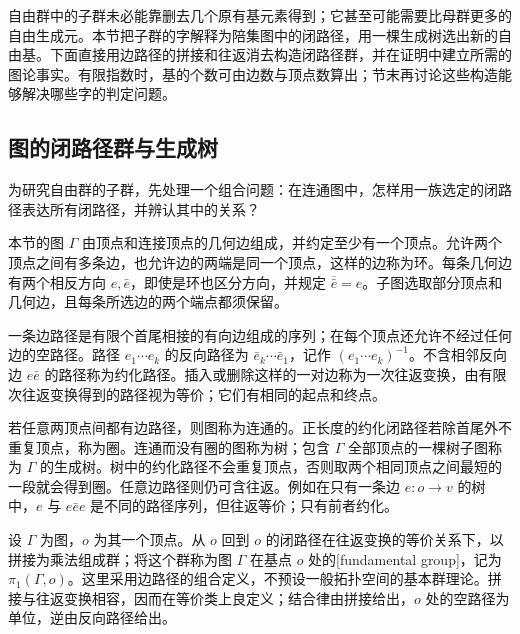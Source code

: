 

自由群中的子群未必能靠删去几个原有基元素得到；它甚至可能需要比母群更多的自由生成元。本节把子群的字解释为陪集图中的闭路径，用一棵生成树选出新的自由基。下面直接用边路径的拼接和往返消去构造闭路径群，并在证明中建立所需的图论事实。有限指数时，基的个数可由边数与顶点数算出；节末再讨论这些构造能够解决哪些字的判定问题。

%
%
%

\subsection{图的闭路径群与生成树}
\label{b1:subsec:0804:01}

为研究自由群的子群，先处理一个组合问题：在连通图中，怎样用一族选定的闭路径表达所有闭路径，并辨认其中的关系？

\ProseParagraphBreak
本节的图 \(\Gamma\) 由顶点和连接顶点的几何边组成，并约定至少有一个顶点。允许两个顶点之间有多条边，也允许边的两端是同一个顶点，这样的边称为环。每条几何边有两个相反方向 \(e,\bar e\)，即使是环也区分方向，并规定 \(\overline{\bar e}=e\)。子图选取部分顶点和几何边，且每条所选边的两个端点都须保留。

\ProseParagraphBreak
一条边路径是有限个首尾相接的有向边组成的序列；在每个顶点还允许不经过任何边的空路径。路径 \(e_1\cdots e_k\) 的反向路径为 \(\bar e_k\cdots\bar e_1\)，记作 \((e_1\cdots e_k)^{-1}\)。不含相邻反向边 \(e\bar e\) 的路径称为约化路径。插入或删除这样的一对边称为一次往返变换，由有限次往返变换得到的路径视为等价；它们有相同的起点和终点。

\ProseParagraphBreak
若任意两顶点间都有边路径，则图称为连通的。正长度的约化闭路径若除首尾外不重复顶点，称为圈。连通而没有圈的图称为树；包含 \(\Gamma\) 全部顶点的一棵树子图称为 \(\Gamma\) 的生成树。树中的约化路径不会重复顶点，否则取两个相同顶点之间最短的一段就会得到圈。任意边路径则仍可含往返。例如在只有一条边 \(e:o\rightarrow v\) 的树中，\(e\) 与 \(e\bar e e\) 是不同的路径序列，但往返等价；只有前者约化。

\ProseParagraphBreak
设 \(\Gamma\) 为图，\(o\) 为其一个顶点。从 \(o\) 回到 \(o\) 的闭路径在往返变换的等价关系下，以拼接为乘法组成群；将这个群称为图 \(\Gamma\) 在基点 \(o\) 处的[fundamental group]，记为 \(\pi_1(\Gamma,o)\)。这里采用边路径的组合定义，不预设一般拓扑空间的基本群理论。拼接与往返变换相容，因而在等价类上良定义；结合律由拼接给出，\(o\) 处的空路径为单位，逆由反向路径给出。

